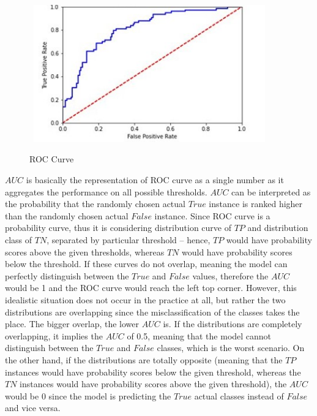  \begin{figure}[H]
    \centering
    \caption{ROC Curve}\vspace{0.5em}
    \label{fig:roccurvetheory}\
    \includegraphics[width=100mm]{Figures/ROC_theory.jpg}

    \vspace{-1em}
\end{figure}

$AUC$ is basically the representation of ROC curve as a single number as it aggregates the performance on all possible thresholds.
$AUC$ can be interpreted as the probability that the randomly chosen actual $True$ instance is ranked higher than the randomly chosen actual $False$ instance.
Since ROC curve is a probability curve, thus it is considering distribution curve of $TP$ and distribution class of $TN$, separated by particular threshold – hence, $TP$ would have probability scores above the given thresholds, whereas $TN$ would have probability scores below the threshold.
If these curves do not overlap, meaning the model can perfectly distinguish between the $True$ and $False$ values, therefore the $AUC$ would be 1 and the ROC curve would reach the left top corner.
However, this idealistic situation does not occur in the practice at all, but rather the two distributions are overlapping since the misclassification of the classes takes the place.
The bigger overlap, the lower $AUC$ is.
If the distributions are completely overlapping, it implies the $AUC$ of 0.5, meaning that the model cannot distinguish between the $True$ and $False$ classes, which is the worst scenario.
On the other hand, if the distributions are totally opposite (meaning that the $TP$ instances would have probability scores below the given threshold, whereas the $TN$ instances would have probability scores above the given threshold), the $AUC$ would be 0 since the model is predicting the $True$ actual classes instead of $False$ and vice versa.

